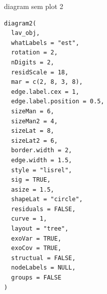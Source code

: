 \documentclass[a4paper]{book}
\begin{document}
%
\begin{Description}
diagram sem plot 2
\end{Description}
%
\begin{Usage}
\begin{verbatim}
diagram2(
  lav_obj,
  whatLabels = "est",
  rotation = 2,
  nDigits = 2,
  residScale = 18,
  mar = c(2, 8, 3, 8),
  edge.label.cex = 1,
  edge.label.position = 0.5,
  sizeMan = 6,
  sizeMan2 = 4,
  sizeLat = 8,
  sizeLat2 = 6,
  border.width = 2,
  edge.width = 1.5,
  style = "lisrel",
  sig = TRUE,
  asize = 1.5,
  shapeLat = "circle",
  residuals = FALSE,
  curve = 1,
  layout = "tree",
  exoVar = TRUE,
  exoCov = TRUE,
  structual = FALSE,
  nodeLabels = NULL,
  groups = FALSE
)
\end{verbatim}
\end{Usage}
%
\end{document}
